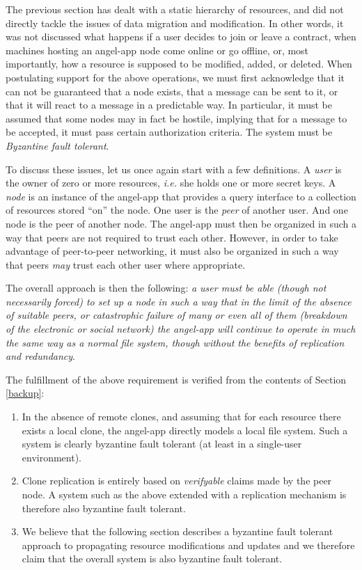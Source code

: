 \documentclass[11pt]{article}
\begin{document}
\begin{mainmatter}
The previous section has dealt with a static hierarchy of resources, and did not directly tackle the issues of data migration and modification. In other words, it was not discussed what happens if a user decides to join or leave a contract, when machines hosting an angel-app node come online or go offline, or, most importantly, how a resource is supposed to be modified, added, or deleted. When postulating support for the above operations, we must first acknowledge that it can not be guaranteed that a node exists, that a message can be sent to it, or that it will react to a message in a predictable way. In particular, it must be assumed that some nodes may in fact be hostile, implying that for a message to be accepted, it must pass certain authorization criteria. The system must be \emph{Byzantine fault tolerant}.

To discuss these issues, let us once again start with a few definitions. A \emph{user} is the owner of zero or more resources, \emph{i.e.} she holds one or more secret keys. A \emph{node} is an instance of the angel-app that provides a query interface to a collection of resources stored ``on'' the node. One user is the \emph{peer} of another user. And one node is the peer of another node. The angel-app must then be organized in such a way that peers are not required to trust each other. However, in order to take advantage of peer-to-peer networking, it must also be organized in such a way that peers \emph{may} trust each other user where appropriate.

The overall approach is then the following: \emph{a user must be able (though not necessarily forced) to set up a node in such a way that in the limit of the absence of suitable peers, or catastrophic failure of many or even all of them (breakdown of the electronic or social network) the angel-app will continue to operate in much the same way as a normal file system, though without the benefits of replication and redundancy}.

The fulfillment of the above requirement is verified from the contents of Section \ref{backup}:
\begin{enumerate} 
\item In the absence of remote clones, and assuming that for each resource there exists a local clone, the angel-app directly models a local file system. Such a system is clearly byzantine fault tolerant (at least in a single-user environment).
\item Clone replication is entirely based on \emph{verifyable} claims made by the peer node. A system such as the above extended with a replication mechanism is therefore also byzantine fault tolerant.
\item We believe that the following section describes a byzantine fault tolerant approach to propagating resource modifications and updates and we therefore claim that the overall system is also byzantine fault tolerant. 
\end{enumerate}


\end{mainmatter}
\end{document}
